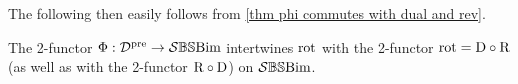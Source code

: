 The following then easily follows from \cref{thm phi commutes with dual and rev}.
\begin{corollary}\label{corollary phi intertwines rotation}
    The 2-functor $\Phi: \mathcal{D}^{\operatorname{pre}} \rightarrow \mathcal{S}\mathbb{BS}\text{Bim}$ intertwines $\operatorname{rot}$ with the 2-functor $\operatorname{rot}= \mathrm{D} \circ \mathrm{R}$ (as well as with the 2-functor $\mathrm{R} \circ \mathrm{D}$) on $\mathcal{S}\mathbb{BS}\text{Bim}$. 
\end{corollary}


